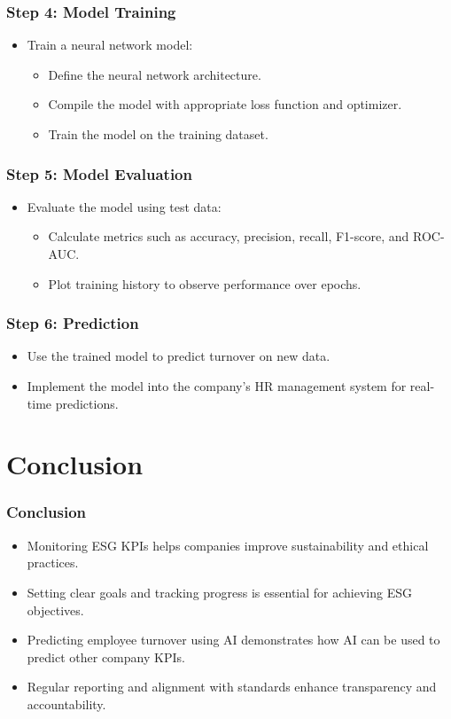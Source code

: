 \documentclass{beamer}
\begin{document}
\begin{frame}
\frametitle{Step 4: Model Training}
\begin{itemize}
    \item Train a neural network model:
        \begin{itemize}
            \item Define the neural network architecture.
            \item Compile the model with appropriate loss function and optimizer.
            \item Train the model on the training dataset.
        \end{itemize}
\end{itemize}
\end{frame}

\begin{frame}
\frametitle{Step 5: Model Evaluation}
\begin{itemize}
    \item Evaluate the model using test data:
        \begin{itemize}
            \item Calculate metrics such as accuracy, precision, recall, F1-score, and ROC-AUC.
            \item Plot training history to observe performance over epochs.
        \end{itemize}
\end{itemize}
\end{frame}

\begin{frame}
\frametitle{Step 6: Prediction}
\begin{itemize}
    \item Use the trained model to predict turnover on new data.
    \item Implement the model into the company's HR management system for real-time predictions.
\end{itemize}
\end{frame}

\section{Conclusion}

\begin{frame}
\frametitle{Conclusion}
\begin{itemize}
    \item Monitoring ESG KPIs helps companies improve sustainability and ethical practices.
    \item Setting clear goals and tracking progress is essential for achieving ESG objectives.
    \item Predicting employee turnover using AI demonstrates how AI can be used to predict other company KPIs.
    \item Regular reporting and alignment with standards enhance transparency and accountability.
\end{itemize}
\end{frame}
\end{document}
